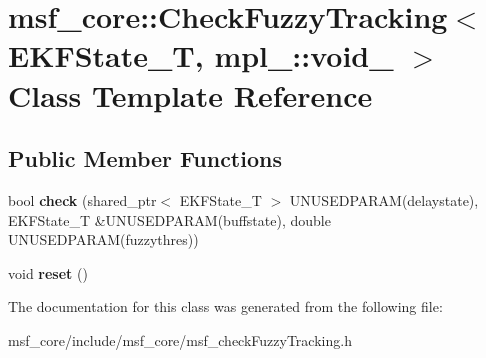 \hypertarget{classmsf__core_1_1CheckFuzzyTracking_3_01EKFState__T_00_01mpl___1_1void___01_4}{\section{msf\-\_\-core\-:\-:Check\-Fuzzy\-Tracking$<$ E\-K\-F\-State\-\_\-\-T, mpl\-\_\-\-:\-:void\-\_\- $>$ Class Template Reference}
\label{classmsf__core_1_1CheckFuzzyTracking_3_01EKFState__T_00_01mpl___1_1void___01_4}
}
\subsection*{Public Member Functions}
\begin{DoxyCompactItemize}
\item 
\hypertarget{classmsf__core_1_1CheckFuzzyTracking_3_01EKFState__T_00_01mpl___1_1void___01_4_ac64f28ba484886543a8c502e553ad7a2}{bool {\bfseries check} (shared\-\_\-ptr$<$ E\-K\-F\-State\-\_\-\-T $>$ U\-N\-U\-S\-E\-D\-P\-A\-R\-A\-M(delaystate), E\-K\-F\-State\-\_\-\-T \&U\-N\-U\-S\-E\-D\-P\-A\-R\-A\-M(buffstate), double U\-N\-U\-S\-E\-D\-P\-A\-R\-A\-M(fuzzythres))}\label{classmsf__core_1_1CheckFuzzyTracking_3_01EKFState__T_00_01mpl___1_1void___01_4_ac64f28ba484886543a8c502e553ad7a2}

\item 
\hypertarget{classmsf__core_1_1CheckFuzzyTracking_3_01EKFState__T_00_01mpl___1_1void___01_4_af60f59eae93ed179973dfbb7f629f5bf}{void {\bfseries reset} ()}\label{classmsf__core_1_1CheckFuzzyTracking_3_01EKFState__T_00_01mpl___1_1void___01_4_af60f59eae93ed179973dfbb7f629f5bf}

\end{DoxyCompactItemize}


The documentation for this class was generated from the following file\-:\begin{DoxyCompactItemize}
\item 
msf\-\_\-core/include/msf\-\_\-core/msf\-\_\-check\-Fuzzy\-Tracking.\-h\end{DoxyCompactItemize}
